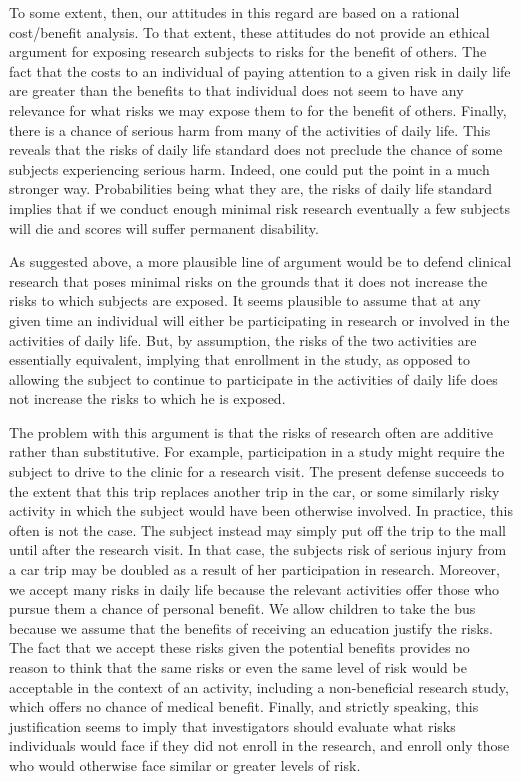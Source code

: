 \documentclass[12p]{article}
\begin{document}
To some extent, then, our attitudes in this regard are based on a rational cost/benefit analysis. To that extent, these attitudes do not provide an ethical argument for exposing research subjects to risks for the benefit of others. The fact that the costs to an individual of paying attention to a given risk in daily life are greater than the benefits to that individual does not seem to have any relevance for what risks we may expose them to for the benefit of others. Finally, there is a chance of serious harm from many of the activities of daily life. This reveals that the risks of daily life standard does not preclude the chance of some subjects experiencing serious harm. Indeed, one could put the point in a much stronger way. Probabilities being what they are, the risks of daily life standard implies that if we conduct enough minimal risk research eventually a few subjects will die and scores will suffer permanent disability.

As suggested above, a more plausible line of argument would be to defend clinical research that poses minimal risks on the grounds that it does not increase the risks to which subjects are exposed. It seems plausible to assume that at any given time an individual will either be participating in research or involved in the activities of daily life. But, by assumption, the risks of the two activities are essentially equivalent, implying that enrollment in the study, as opposed to allowing the subject to continue to participate in the activities of daily life does not increase the risks to which he is exposed.

The problem with this argument is that the risks of research often are additive rather than substitutive. For example, participation in a study might require the subject to drive to the clinic for a research visit. The present defense succeeds to the extent that this trip replaces another trip in the car, or some similarly risky activity in which the subject would have been otherwise involved. In practice, this often is not the case. The subject instead may simply put off the trip to the mall until after the research visit. In that case, the subjects risk of serious injury from a car trip may be doubled as a result of her participation in research. Moreover, we accept many risks in daily life because the relevant activities offer those who pursue them a chance of personal benefit. We allow children to take the bus because we assume that the benefits of receiving an education justify the risks. The fact that we accept these risks given the potential benefits provides no reason to think that the same risks or even the same level of risk would be acceptable in the context of an activity, including a non-beneficial research study, which offers no chance of medical benefit. Finally, and strictly speaking, this justification seems to imply that investigators should evaluate what risks individuals would face if they did not enroll in the research, and enroll only those who would otherwise face similar or greater levels of risk.
\end{document}
